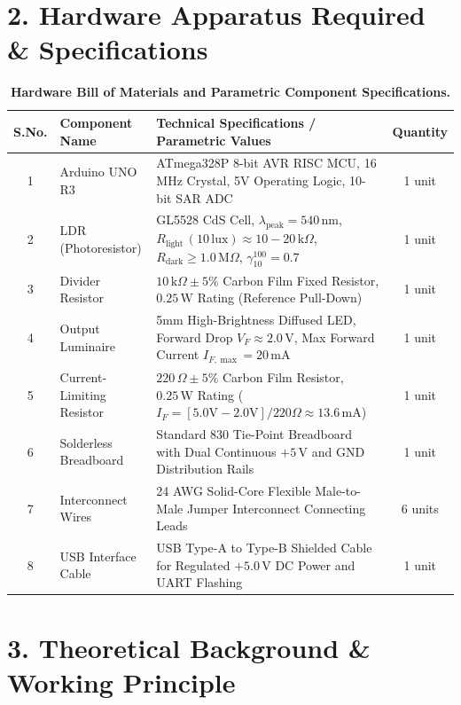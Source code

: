 \documentclass[10pt,a4paper]{article}
\begin{document}
\section*{2. Hardware Apparatus Required \& Specifications}
\begin{table}[H]
\centering
\footnotesize
\renewcommand{\arraystretch}{1.15}
\begin{tabularx}{\textwidth}{|c|l|X|c|}
\hline
\textbf{S.No.} & \textbf{Component Name} & \textbf{Technical Specifications / Parametric Values} & \textbf{Quantity} \\
\hline
1 & Arduino UNO R3 & ATmega328P 8-bit AVR RISC MCU, 16 MHz Crystal, 5V Operating Logic, 10-bit SAR ADC & 1 unit \\
2 & LDR (Photoresistor) & GL5528 CdS Cell, $\lambda_{\text{peak}} = 540\,\text{nm}$, $R_{\text{light}}\,(10\,\text{lux}) \approx 10-20\,\text{k}\Omega$, $R_{\text{dark}} \ge 1.0\,\text{M}\Omega$, $\gamma_{10}^{100} = 0.7$ & 1 unit \\
3 & Divider Resistor & $10\,\text{k}\Omega \pm 5\%$ Carbon Film Fixed Resistor, $0.25\,\text{W}$ Rating (Reference Pull-Down) & 1 unit \\
4 & Output Luminaire & 5mm High-Brightness Diffused LED, Forward Drop $V_F \approx 2.0\,\text{V}$, Max Forward Current $I_{F,\max} = 20\,\text{mA}$ & 1 unit \\
5 & Current-Limiting Resistor & $220\,\Omega \pm 5\%$ Carbon Film Resistor, $0.25\,\text{W}$ Rating ($I_F = [5.0\text{V} - 2.0\text{V}]/220\Omega \approx 13.6\,\text{mA}$) & 1 unit \\
6 & Solderless Breadboard & Standard 830 Tie-Point Breadboard with Dual Continuous $+5\,\text{V}$ and GND Distribution Rails & 1 unit \\
7 & Interconnect Wires & 24 AWG Solid-Core Flexible Male-to-Male Jumper Interconnect Connecting Leads & 6 units \\
8 & USB Interface Cable & USB Type-A to Type-B Shielded Cable for Regulated $+5.0\,\text{V}$ DC Power and UART Flashing & 1 unit \\
\hline
\end{tabularx}
\caption{\textbf{Hardware Bill of Materials and Parametric Component Specifications.}}
\end{table}

\section*{3. Theoretical Background \& Working Principle}
\end{document}
